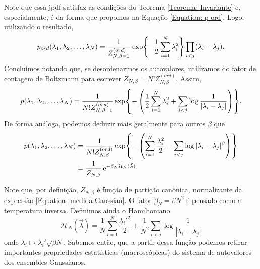 Note que essa jpdf satisfaz as condições do Teorema \ref{Teorema: Invariante} e, especialmente, é da forma que propomos na Equação \ref{Equation: p-ord}. Logo, utilizando o resultado, $$ p_{ord}(\lambda_1, \lambda_2, \dots, \lambda_N) = \frac{1}{Z_{N, \beta = 1}^{(ord)}} \exp{-\frac{1}{2} \sum_{i = 1}^{N} \lambda_i^2} \prod_{i < j} (\lambda_i - \lambda_j).$$ Concluímos notando que, se desordenarmos os autovalores, utilizamos do fator de contagem de Boltzmann \cite[Capítulo~3]{landau2013statistical} para escrever $ Z_{N, \beta} = N! Z_{N, \beta}^{(ord)}$. Assim, $$ p(\lambda_1, \lambda_2, \dots, \lambda_N) = \frac{1}{ N! Z_{N, \beta = 1}^{(ord)}} \exp{- \left(\frac{1}{2} \sum_{i = 1}^{N} \lambda_i^2 + \sum_{i < j} \log\frac{1}{|\lambda_i - \lambda_j|} \right)}.$$
De forma análoga, podemos deduzir mais geralmente para outros $\beta$ que
\begin{equation}
	\begin{split}
		p(\lambda_1, \lambda_2, \dots, \lambda_N) 
		&= \frac{1}{ N! Z_{N, \beta}^{(ord)}} \exp{- \left(\sum_{i = 1}^{N} \frac{\lambda_i^2}{2} - \sum_{i < j} \log{|\lambda_i - \lambda_j|^{\beta}} \right)} \\
		&= \frac{1}{Z_{N, \beta}} \operatorname{\textrm e}^{-\beta_N \mathcal{H}_N(\vec{\lambda})}
	\end{split}
\label{Equation: medida Gaussian}
\end{equation}

Note que, por definição, $Z_{N, \beta}$ é função de partição canônica, normalizante da expressão \ref{Equation: medida Gaussian}. O fator $\beta_N = \beta N^2$ é pensado como a temperatura inversa. Definimos ainda o Hamiltoniano $$\mathcal{H}_N(\vec{\lambda}) = \frac{1}{N}\sum_{i = 1}^{N} \frac{\lambda_i'^2}{2} + \frac{1}{N^2} \sum_{i < j} \log{\frac{1}{|\lambda_i - \lambda_j|}}$$ onde $\lambda_i \mapsto \lambda_i' \sqrt{\beta N}$. Sabemos então, que a partir dessa função podemos retirar importantes propriedades estatísticas (macroscópicas) do sistema de autovalores dos ensembles Gaussianos.

